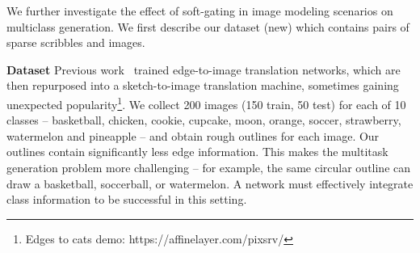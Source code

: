 \noindent We further investigate the effect of soft-gating in image modeling scenarios on multiclass generation. We first describe our dataset (new) which contains pairs of sparse scribbles and images.

\vspace{2mm} \noindent \textbf{Dataset} Previous work~\cite{isola2016image2image,sangkloy2017scribbler,zhu2017unpaired,wang2017high} trained edge-to-image translation networks, which are then repurposed into a sketch-to-image translation machine, sometimes gaining unexpected popularity\footnote{Edges to cats demo: https://affinelayer.com/pixsrv/}. We collect 200 images (150 train, 50 test) for each of 10 classes -- basketball, chicken, cookie, cupcake, moon, orange, soccer, strawberry,  watermelon and pineapple -- and obtain rough outlines for each image. %
Our outlines contain significantly less edge information. This makes the multitask generation problem more challenging -- for example, the same circular outline can draw a basketball, soccerball, or watermelon. A network must effectively integrate class information to be successful in this setting.

